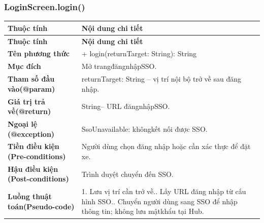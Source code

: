 \subsubsection{LoginScreen.login()}
\begin{longtable}{|L{0.24\textwidth}|L{0.70\textwidth}|}
\hline
\textbf{Thuộc tính} & \textbf{Nội dung chi tiết} \\
\hline
\endfirsthead
\hline
\textbf{Thuộc tính} & \textbf{Nội dung chi tiết} \\
\hline
\endhead
\textbf{Tên phương thức} & + login(returnTarget: String): String \\
\hline
\textbf{Mục đích} & Mở trangđăngnhậpSSO. \\
\hline
\textbf{Tham số đầu vào}\newline \textbf{(@param)} & returnTarget: String – vị trí nội bộ trở về sau đăng nhập. \\
\hline
\textbf{Giá trị trả về(@return)} & String– URL đăngnhậpSSO. \\
\hline
\textbf{Ngoại lệ (@exception)} & SsoUnavailable: khôngkết nối được SSO. \\
\hline
\textbf{Tiền điều kiện (Pre-}\newline \textbf{conditions)} & Người dùng chọn đăng nhập hoặc cần xác thực để đặt xe. \\
\hline
\textbf{Hậu điều kiện (Post-}\newline \textbf{conditions)} & Trình duyệt chuyển đến SSO. \\
\hline
\textbf{Luồng thuật toán}\newline \textbf{(Pseudo-code)} & 1. Lưu vị trí cần trở về.. Lấy URL đăng nhập từ cấu hình SSO.. Chuyển người dùng sang SSO để nhập thông tin; không lưu mật\newline khẩu tại Hub. \\
\hline
\end{longtable}
\vspace{-0.5\baselineskip}
